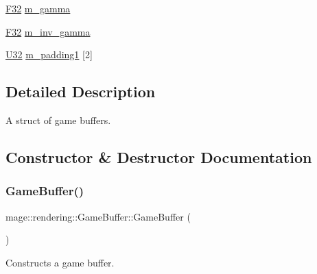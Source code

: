 \begin{DoxyCompactItemize}
\item 
\hyperlink{namespacemage_aa97e833b45f06d60a0a9c4fc22ae02c0}{F32} \hyperlink{structmage_1_1rendering_1_1_game_buffer_af95208ebc18bf3c124fef8e8810343db}{m\+\_\+gamma}
\item 
\hyperlink{namespacemage_aa97e833b45f06d60a0a9c4fc22ae02c0}{F32} \hyperlink{structmage_1_1rendering_1_1_game_buffer_aa1b45ad86f1eae57e4ba1dbc1732994b}{m\+\_\+inv\+\_\+gamma}
\item 
\hyperlink{namespacemage_a41c104c036fba3756a74e19f793eeaa1}{U32} \hyperlink{structmage_1_1rendering_1_1_game_buffer_a235dc002359e2106b4aee25e07470da8}{m\+\_\+padding1} \mbox{[}2\mbox{]}
\end{DoxyCompactItemize}


\subsection{Detailed Description}
A struct of game buffers. 

\subsection{Constructor \& Destructor Documentation}
\hypertarget{structmage_1_1rendering_1_1_game_buffer_ad38868666dffd8967a04e87a6ff9ebc5}{}\label{structmage_1_1rendering_1_1_game_buffer_ad38868666dffd8967a04e87a6ff9ebc5} 
\subsubsection{\texorpdfstring{Game\+Buffer()}{GameBuffer()}\hspace{0.1cm}{\footnotesize\ttfamily [1/3]}}
{\footnotesize\ttfamily mage\+::rendering\+::\+Game\+Buffer\+::\+Game\+Buffer (\begin{DoxyParamCaption}{ }\end{DoxyParamCaption})\hspace{0.3cm}{\ttfamily [noexcept]}}

Constructs a game buffer. \hypertarget{structmage_1_1rendering_1_1_game_buffer_ad7cd514cc0c422bce555f8435a06d7d0}{}\label{structmage_1_1rendering_1_1_game_buffer_ad7cd514cc0c422bce555f8435a06d7d0} 
